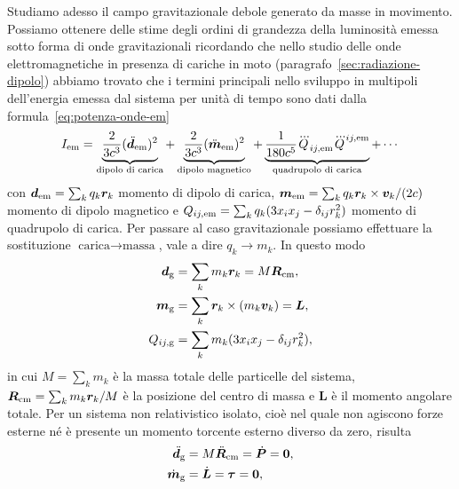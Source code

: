Studiamo adesso il campo gravitazionale debole generato da masse in movimento.
Possiamo ottenere delle stime degli ordini di grandezza della luminosità emessa
sotto forma di onde gravitazionali ricordando che nello studio delle onde
elettromagnetiche in presenza di cariche in moto
(paragrafo~\ref{sec:radiazione-dipolo}) abbiamo trovato che i termini principali
nello sviluppo in multipoli dell'energia emessa dal sistema per unità di tempo
sono dati dalla formula~\eqref{eq:potenza-onde-em}
\begin{equation}
  I_{\textup{em}} = \underbrace{\frac{2}{3c^{3}}
    (\ddot{\bm{d}}_{\textup{em}})^{2}}_{\text{dipolo di carica}} +
  \underbrace{\frac{2}{3c^{3}} (\ddot{\bm{m}}_{\textup{em}})^{2}}_{\text{dipolo
      magnetico}} +
  \underbrace{\frac{1}{180c^{5}}
    \dddot{Q}_{ij,\textup{em}}\dddot{Q}^{ij,\textup{em}}}_{\text{quadrupolo di
      carica}} + \cdots
\end{equation}
con $\bm{d}_{\textup{em}} = \sum_{k} q_{k} \bm{r}_{k}$ momento di dipolo di
carica, $\bm{m}_{\textup{em}} = \sum_{k} q_{k} \bm{r}_{k} \times
\bm{v}_{k}/(2c)$ momento di dipolo magnetico e $Q_{ij,\textup{em}} = \sum_{k}
q_{k}(3x_{i}x_{j} -\delta_{ij}r_{k}^{2})$ momento di quadrupolo di carica.  Per
passare al caso gravitazionale possiamo effettuare la sostituzione
$\text{carica} \to \text{massa}$, vale a dire $q_{k} \to m_{k}$.  In questo modo
\begin{subequations}
  \begin{align}
    \bm{d}_{\textup{g}} &= \sum_{k} m_{k} \bm{r}_{k} = M \bm{R}_{\textup{cm}},\\
    \bm{m}_{\textup{g}} &= \sum_{k} \bm{r}_{k} \times (m_{k} \bm{v}_{k}) =
                          \bm{L}, \\
    Q_{ij,\textup{g}} &= \sum_{k} m_{k}(3x_{i}x_{j} -\delta_{ij}r_{k}^{2}),
  \end{align}
\end{subequations}
in cui $M = \sum_{k} m_{k}$ è la massa totale delle particelle del sistema,
$\bm{R}_{\textup{cm}} = \sum_{k} m_{k} \bm{r}_{k}/M$ è la posizione del centro
di massa e $\bm{L}$ è il momento angolare totale.  Per un sistema non
relativistico isolato, cioè nel quale non agiscono forze esterne né è presente
un momento torcente esterno diverso da zero, risulta
\begin{subequations}
  \begin{align}
    \ddot{\bm{d}}_{\textup{g}} &= M \ddot{\bm{R}}_{\textup{cm}} =
    \dot{\bm{P}} = \bm{0}, \\
    \dot{\bm{m}}_{\textup{g}} &= \dot{\bm{L}} = \bm{\tau} = \bm{0},
  \end{align}
\end{subequations}

